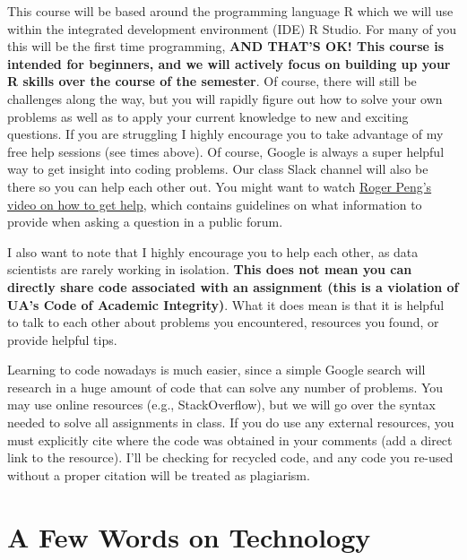 \documentclass[
]{book}
\begin{document}
This course will be based around the programming language R which we will use within the integrated development environment (IDE) R Studio. For many of you this will be the first time programming, \textbf{AND THAT'S OK! This course is intended for beginners, and we will actively focus on building up your R skills over the course of the semester}. Of course, there will still be challenges along the way, but you will rapidly figure out how to solve your own problems as well as to apply your current knowledge to new and exciting questions. If you are struggling I highly encourage you to take advantage of my free help sessions (see times above). Of course, Google is always a super helpful way to get insight into coding problems. Our class Slack channel will also be there so you can help each other out. You might want to watch \href{https://www.youtube.com/watch?v=ZFaWxxzouCY}{Roger Peng's video on how to get help}, which contains guidelines on what information to provide when asking a question in a public forum.

I also want to note that I highly encourage you to help each other, as data scientists are rarely working in isolation. \textbf{This does not mean you can directly share code associated with an assignment (this is a violation of UA's Code of Academic Integrity)}. What it does mean is that it is helpful to talk to each other about problems you encountered, resources you found, or provide helpful tips.

Learning to code nowadays is much easier, since a simple Google search will research in a huge amount of code that can solve any number of problems. You may use online resources (e.g., StackOverflow), but we will go over the syntax needed to solve all assignments in class. If you do use any external resources, you must explicitly cite where the code was obtained in your comments (add a direct link to the resource). I'll be checking for recycled code, and any code you re-used without a proper citation will be treated as plagiarism.

\hypertarget{a-few-words-on-technology}{%
\section{A Few Words on Technology}\label{a-few-words-on-technology}}
\end{document}
